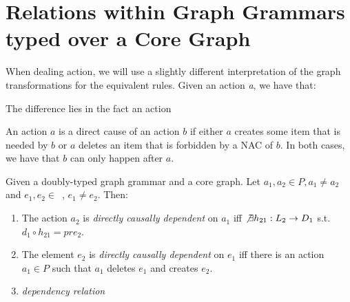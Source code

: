 \section{Relations within Graph Grammars typed over a Core Graph}



\begin{remark} When dealing action, we will use a slightly different interpretation of the graph transformations for the equivalent rules. Given an action \emph{a}, we have that:
  

The difference lies in the fact an action 
\end{remark}

\begin{intuition} An action $a$ is a direct cause of an action $b$ if either $a$ creates some item that is needed by $b$ or $a$ deletes an item that is forbidden by a NAC of $b$. In both cases, we have that $b$ can only happen after $a$. 
\end{intuition}

\begin{definition} Given \doublyTypedGraphGrammarCore{} a doubly-typed graph grammar and \coreGraph{} a core graph. Let $a_1, a_2 \in P, a_1 \ne a_2$ and \mbox{$e_1, e_2 \in $ \coreGraph{},} $e_1 \ne e_2$. Then: 

  \begin{enumerate}
    \item The action $a_2$ is \emph{directly causally dependent} on $a_1$ iff $\not\exists h_{21} : L_2 \rightarrow D_1$ s.t. \mbox{$d_1 \circ h_{21} = pre_2$}.

    \item The element $e_2$ is \emph{directly causally dependent} on $e_1$ iff there is an action $a_1 \in P$ such that $a_1$ deletes $e_1$ and creates $e_2$.
    \item \emph{dependency relation}
  \end{enumerate}

\end{definition}


